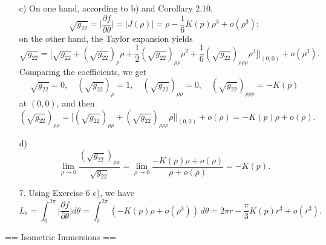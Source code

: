 \begin{itemize}
    c) On one hand, according to b) and Corollary 2.10,
    \[\sqrt{g_{22}}=\bigg|\frac{\partial f}{\partial\theta}\bigg|
    =|J(\rho)|=\rho-\frac{1}{6}K(p)\rho^3+o(\rho^3);\]
    on the other hand, the Taylor expansion yields
    \[\sqrt{g_{22}}=\big[\sqrt{g_{22}}+(\sqrt{g_{22}})_\rho\rho
    +\frac{1}{2}(\sqrt{g_{22}})_{\rho\rho}\rho^2
    +\frac{1}{6}(\sqrt{g_{22}})_{\rho\rho\rho}\rho^3\big]\big|_{(0,0)}
    +o(\rho^3).\]
    Comparing the coefficients, we get
    \[\sqrt{g_{22}}=0,\quad (\sqrt{g_{22}})_\rho=1,\quad 
    (\sqrt{g_{22}})_{\rho\rho}=0,\quad
    (\sqrt{g_{22}})_{\rho\rho\rho}=-K(p)\]
    at $(0,0)$, and then
    \[(\sqrt{g_{22}})_{\rho\rho}=\big[(\sqrt{g_{22}})_{\rho\rho}
    +(\sqrt{g_{22}})_{\rho\rho\rho}\rho\big]\big|_{(0,0)}+o(\rho)
    =-K(p)\rho+o(\rho).\]

    d) \[\lim_{\rho\to0}\frac{(\sqrt{g_{22}})_{\rho\rho}}{\sqrt{g_{22}}}
    =\lim_{\rho\to0}\frac{-K(p)\rho+o(\rho)}{\rho+o(\rho)}=-K(p).\]

    \item[7.] Using Exercise 6 c), we have
    \[L_r=\int_0^{2\pi}\bigg|\frac{\partial f}{\partial\theta}\bigg|d\theta
    =\int_0^{2\pi}(-K(p)\rho+o(\rho^3))\,d\theta
    =2\pi r-\frac{\pi}{3}K(p)r^3+o(r^3).\]
\end{itemize}

== Isometric Immersions ==


